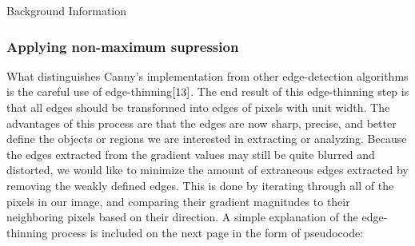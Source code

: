\documentclass[a4paper,12pt]{article}
\begin{document}
\begin{section}{Background Information}
\subsubsection{Applying non-maximum supression}

What distinguishes Canny's implementation from other edge-detection algorithms is the careful use of edge-thinning$\cite{13}$.%
The end result of this edge-thinning step is that all edges should be transformed into edges of pixels with unit width.
The advantages of this process are that the edges are now sharp, precise, and better define the objects or regions we are interested in extracting or analyzing.
Because the edges extracted from the gradient values may still be quite blurred and distorted, we would like to minimize the amount of extraneous edges extracted by removing the weakly defined edges.
This is done by iterating through all of the pixels in our image, and comparing their gradient magnitudes to their neighboring pixels based on their direction. 
A simple explanation of the edge-thinning process is included on the next page in the form of pseudocode:


\end{section}
\end{document}
